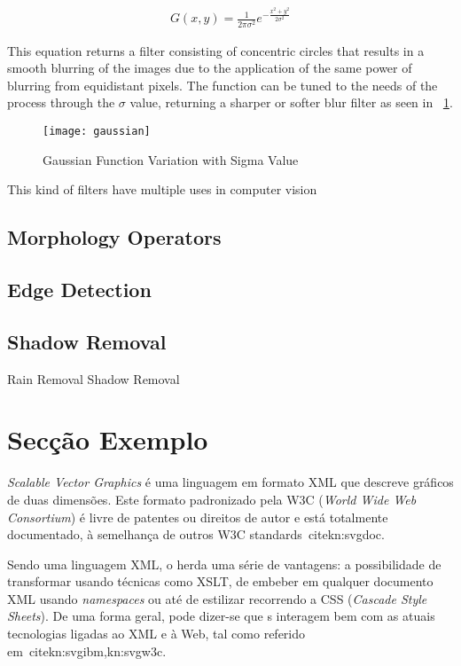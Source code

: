\begin{eqnarray}
\label{eq:gaussian}
G(x,y) = \frac{1}{2\pi \sigma ^{2}}e^{-\frac{x^{2}+y^{2}}{2\sigma ^{2}}}
\end{eqnarray}

This equation returns a filter consisting of concentric circles that results in a smooth blurring of the images due to the application of the same power of blurring from equidistant pixels. The function can be tuned to the needs of the process through the $\sigma$ value, returning a sharper or softer blur filter as seen in ~\ref{fig:gaussian}.


\begin{figure}[h]
  \begin{center}
    \leavevmode
    \texttt{[image: gaussian]}
    \caption{Gaussian Function Variation with Sigma Value}
    \label{fig:gaussian}
  \end{center}
\end{figure}

This kind of filters have multiple uses in computer vision

\subsection{Morphology Operators}

\subsection{Edge Detection}

\subsection{Shadow Removal}
Rain Removal
Shadow Removal

\section{Secção Exemplo}\label{sec:dialecto}

\emph{Scalable Vector Graphics} é uma
linguagem em formato XML que descreve gráficos de duas dimensões. 
Este formato padronizado pela W3C (\emph{World Wide Web Consortium})
é livre de patentes ou direitos de autor e está totalmente
documentado, à semelhança de outros W3C
standards~cite{kn:svgdoc}.

Sendo uma linguagem XML, o \svg{} herda uma série de vantagens: a
possibilidade de transformar \svg{} usando técnicas como
XSLT, de embeber \svg{} em qualquer documento
XML usando \textit{namespaces} ou até de  
estilizar \svg{} recorrendo a CSS (\emph{Cascade Style Sheets}). 
De uma forma geral, pode dizer-se que \svg{}s interagem bem com as
atuais tecnologias ligadas ao XML e à Web, tal como referido
em~cite{kn:svgibm,kn:svgw3c}.


